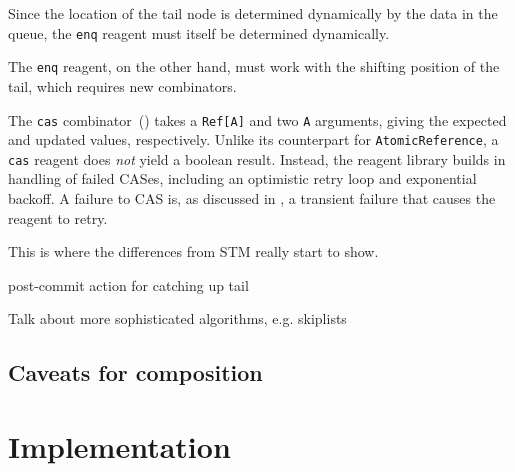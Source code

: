 \documentclass[preprint,nocopyrightspace]{sigplanconf}
\begin{document}
Since the location of the tail node is determined dynamically by the data in
the queue, the \lstinline{enq} reagent must itself be determined dynamically.

The \lstinline{enq} reagent, on the other hand, must work with the shifting
position of the tail, which requires new combinators.


The \lstinline{cas} combinator~() takes a
\lstinline{Ref[A]} and two \lstinline{A} arguments, giving the expected and
updated values, respectively.  Unlike its counterpart for
\lstinline{AtomicReference}, a \lstinline{cas} reagent does \emph{not} yield a
boolean result.  Instead, the reagent library builds in handling of failed
CASes, including an optimistic retry loop and exponential backoff.  A failure
to CAS is, as discussed in , a transient failure that causes
the reagent to retry.




This is where the differences from STM really start to show.

post-commit action for catching up tail

Talk about more sophisticated algorithms, e.g. skiplists

\subsection{Caveats for composition}


\section{Implementation}
\label{sec:implementation}

\end{document}
